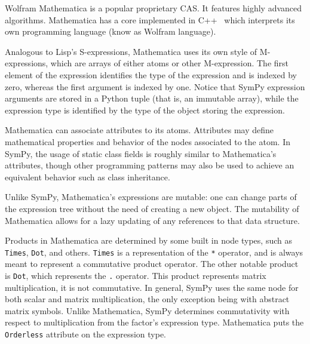 
Wolfram Mathematica is a popular proprietary CAS.
It features highly advanced algorithms.
Mathematica has a core implemented in C++~\cite{Wolfram2016}
which interprets its own programming language (know as Wolfram language).


Analogous to Lisp's S-expressions,
Mathematica uses its own style of M-expres\-sions,
which are arrays of either atoms or other M-expression.
The first element of the expression identifies the type of the expression
and is indexed by zero, whereas the first argument is indexed by one.
Notice that SymPy expression arguments are stored in a Python tuple
(that is, an immutable array),
while the expression type is identified by the type of the object storing the
expression.


Mathematica can associate attributes to its atoms.
Attributes may define mathematical properties and behavior of the nodes
associated to the atom.
In SymPy, the usage of static class fields is roughly similar to Mathematica's
attributes, though other programming patterns may also be used to achieve an
equivalent behavior such as class inheritance.


Unlike SymPy, Mathematica's expressions are mutable:
one can change parts of the expression tree without the need of
creating a new object.
The mutability of Mathematica allows for a lazy updating of any references
to that data structure.


Products in Mathematica are determined by some built in node types, such as
\texttt{Times}, \texttt{Dot}, and others.  \texttt{Times} is a representation of
the \texttt{*} operator, and is always meant to represent a commutative product
operator.  The other notable product is \texttt{Dot}, which represents the
\texttt{.} operator.  This product represents matrix multiplication, it is not
commutative.  In general, SymPy uses the same node for both scalar and matrix
multiplication, the only exception being with abstract matrix symbols.  Unlike
Mathematica, SymPy determines commutativity with respect to multiplication from
the factor's expression type.  Mathematica puts the \texttt{Orderless} attribute
on the expression type.

